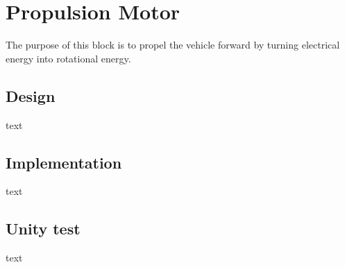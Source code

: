 \section{Propulsion Motor}
The purpose of this block is to propel the vehicle forward by turning electrical energy into rotational energy.

\subsection{Design}
text

\subsection{Implementation}
text

\subsection{Unity test}
text